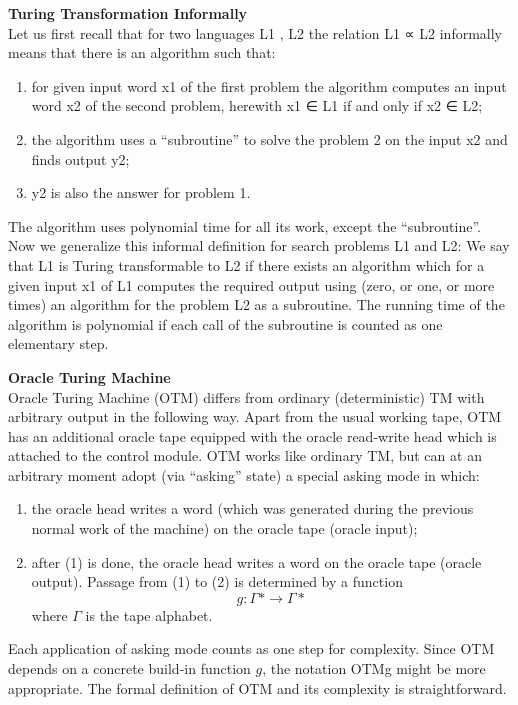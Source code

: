 \textbf{Turing Transformation Informally}\\
Let us first recall that for two languages L1 , L2 the relation L1 ∝ L2 informally means that there is an algorithm such that:
\begin{enumerate}
    \item for given input word x1 of the first problem the algorithm computes an input word x2 of the second problem, herewith x1 ∈ L1 if and only if x2 ∈ L2;
    \item the algorithm uses a “subroutine” to solve the problem 2 on the input x2 and finds output y2;
    \item y2 is also the answer for problem 1.
\end{enumerate}
The algorithm uses polynomial time for all its work, except the “subroutine”. Now
we generalize this informal definition for search problems L1 and L2:
We say that L1 is Turing transformable to L2 if there exists an algorithm which for a given input x1 of L1 computes the required output using (zero, or one, or more times) an algorithm for the problem L2 as a subroutine. The running time of the algorithm is polynomial if each call of the subroutine is counted as one elementary step.

\textbf{Oracle Turing Machine}\\
Oracle Turing Machine (OTM) differs from ordinary (deterministic) TM
with arbitrary output in the following way.
Apart from the usual working tape,
OTM has an additional oracle tape equipped with the oracle read-write head
which is attached to the control module.
OTM works like ordinary TM,
but can at an arbitrary moment adopt (via “asking” state) a special asking mode in which:
\begin{enumerate}
    \item the oracle head writes a word (which was generated during the previous normal work of the machine) on the oracle tape (oracle input);
    \item after (1) is done,
        the oracle head writes a word on the oracle tape (oracle output).
        Passage from (1) to (2) is determined by a function
        $$g: \Gamma\ast \rightarrow \Gamma\ast$$
        where $\Gamma$ is the tape alphabet.
\end{enumerate}
Each application of asking mode counts as one step for complexity.
Since OTM depends on a concrete build-in function $g$,
the notation OTMg might be more appropriate.
The formal definition of OTM and its complexity is straightforward.


